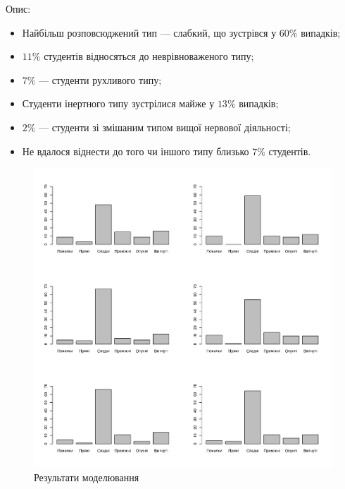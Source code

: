 Опис:
\begin{itemize}
  \item
    Найбільш розповсюджений тип --- слабкий, що зустрівся у $60\%$
    випадків;
  \item
    $11\%$ студентів відносяться до неврівноваженого типу;
  \item
    $7\%$ --- студенти рухливого типу;
  \item
    Студенти інертного типу зустрілися майже у $13\%$ випадків;
  \item
    $2\%$ --- студенти зі змішаним типом вищої нервової діяльності;
  \item
    Не вдалося віднести до того чи іншого типу близько $7\%$ студентів.
\end{itemize}

\begin{figure}[h]
  \centering
  \includegraphics[width=\textwidth]{images/poisson_types}
  \caption{Результати моделювання}
  \label{fig:tapping:poisson:types}
\end{figure}
